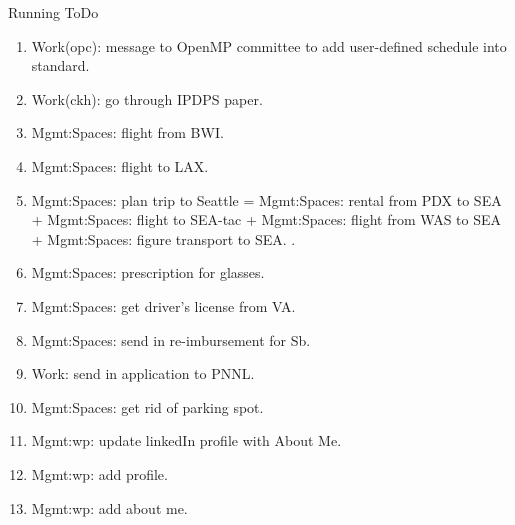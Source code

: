 \begin{columns}
\begin{column}{0.6\linewidth}
\begin{block}{Running ToDo}
\begin{enumerate}
    TODO:L3: past: ask whether you should work on 
    TODO:L3: intent: ask whether you can be official without ARB. 
    TODO:L3: outcome: he says ``yes'' that makes sense. 
    
    Hi Bronis, 
    
    You had asked me during the OpenMP language committee meeting
    this past Tuesday about my institution. 

    I expect to be involved in the OpenMP language comittee in the
    next year or so. 
    
    I'd like to be part of the committee officially if
    possible. Looking at the OpenMP ARB and the members that attend
    the group, I see the members. For example, Tom Scogland is on
    the calls but isn't on the ARB. 
    
    Vivek 
    
    I believe that I'll be an auxiliary member.       
    Vivek 

    \item \tiny Work(opc): message to OpenMP committee to add
      user-defined schedule into standard.
    \item \tiny Work(ckh): go through IPDPS paper. 
    \item \tiny Mgmt:Spaces: flight from BWI. 
    \item \tiny Mgmt:Spaces: flight to LAX. 

    \item \tiny Mgmt:Spaces: plan trip to Seattle  = Mgmt:Spaces:
      rental from PDX to SEA + Mgmt:Spaces: flight to SEA-tac +
      Mgmt:Spaces: flight from WAS to SEA + Mgmt:Spaces: figure
      transport to SEA. . 

    \item \tiny Mgmt:Spaces: prescription for glasses.
    \item \tiny Mgmt:Spaces: get driver's license from VA. 
    \item \tiny Mgmt:Spaces: send in re-imbursement for Sb. 
    \item \tiny Work: send in application to PNNL. 
    \item \tiny Mgmt:Spaces: get rid of parking spot. 
    \item \tiny Mgmt:wp: update linkedIn profile with About Me. 
    \item \tiny Mgmt:wp: add profile.
    \item \tiny Mgmt:wp: add about me. 


\end{enumerate}
\end{block}
\end{column}
\end{columns}
